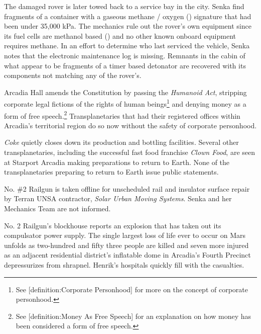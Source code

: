The damaged rover is later towed back to a service bay in the city. Senka find fragments of a container with a gaseous methane / oxygen () signature that had been under 35,000 kPa. The mechanics rule out the rover's own equipment since its fuel cells are methanol based () and no other known onboard equipment requires methane. In an effort to determine who last serviced the vehicle, Senka notes that the electronic maintenance log is missing. Remnants in the cabin of what appear to be fragments of a timer based detonator are recovered with its components not matching any of the rover's.
\StopTimelineDate

Arcadia Hall amends the Constitution by passing the {\it Humanoid Act}, stripping corporate legal fictions of the rights of human beings\footnote{See [definition:Corporate Personhood] for more on the concept of corporate personhood.} and denying money as a form of free speech.\footnote{See [definition:Money As Free Speech] for an explanation on how money has been considered a form of free speech.} Transplanetaries that had their registered offices within Arcadia's territorial region do so now without the safety of corporate personhood.
\StopTimelineDate

{\it Coke} quietly closes down its production and bottling facilities. Several other transplanetaries, including the successful fast food franchise {\it Clown Food}, are seen at Starport Arcadia making preparations to return to Earth. None of the transplanetaries preparing to return to Earth issue public statements.
\StopTimelineDate

No. \#2 Railgun is taken offline for unscheduled rail and insulator surface repair by Terran UNSA contractor, {\it Solar Urban Moving Systems}. Senka and her Mechanics Team are not informed.
\StopTimelineDate

No. \type{#}2 Railgun's blockhouse reports an explosion that has taken out its compulsator power supply. The single largest loss of life ever to occur on Mars unfolds as two-hundred and fifty three people are killed and seven more injured as an adjacent residential district's inflatable dome in Arcadia's Fourth Precinct depressurizes from shrapnel. Henrik's hospitals quickly fill with the casualties.

